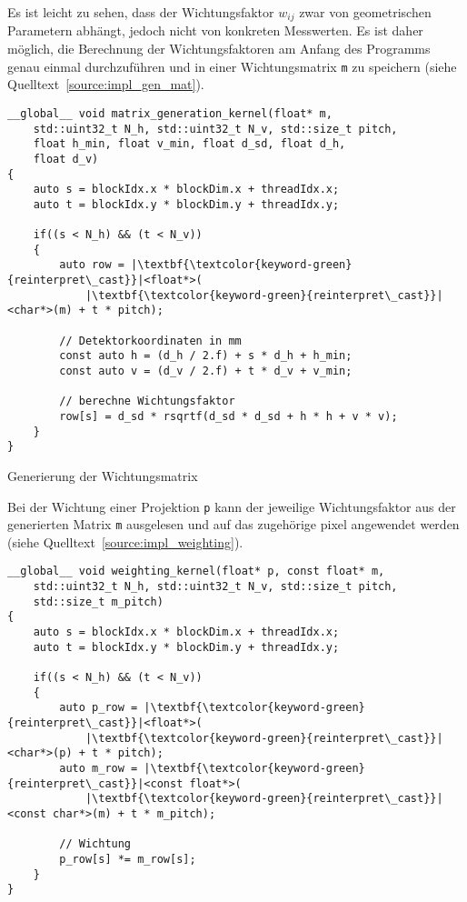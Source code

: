 Es ist leicht zu sehen, dass der Wichtungsfaktor $w_{ij}$ zwar von geometrischen Parametern abhängt, jedoch nicht von
konkreten Messwerten. Es ist daher möglich, die Berechnung der Wichtungsfaktoren am Anfang des Programms genau einmal
durchzuführen und in einer Wichtungsmatrix \texttt{m} zu speichern (siehe Quelltext~\ref{source:impl_gen_mat}).

\begin{listing}
\begin{verbatim}
__global__ void matrix_generation_kernel(float* m,
    std::uint32_t N_h, std::uint32_t N_v, std::size_t pitch,
    float h_min, float v_min, float d_sd, float d_h,
    float d_v)
{
    auto s = blockIdx.x * blockDim.x + threadIdx.x;
    auto t = blockIdx.y * blockDim.y + threadIdx.y;

    if((s < N_h) && (t < N_v))
    {
        auto row = |\textbf{\textcolor{keyword-green}{reinterpret\_cast}}|<float*>(
            |\textbf{\textcolor{keyword-green}{reinterpret\_cast}}|<char*>(m) + t * pitch);

        // Detektorkoordinaten in mm
        const auto h = (d_h / 2.f) + s * d_h + h_min;
        const auto v = (d_v / 2.f) + t * d_v + v_min;

        // berechne Wichtungsfaktor
        row[s] = d_sd * rsqrtf(d_sd * d_sd + h * h + v * v);
    }
}
\end{verbatim}
\caption{Generierung der Wichtungsmatrix}
\label{source:impl_gen_mat}
\end{listing}

Bei der Wichtung einer Projektion \texttt{p} kann der jeweilige Wichtungsfaktor aus der generierten Matrix \texttt{m}
ausgelesen und auf das zugehörige \gls{pixel} angewendet werden (siehe Quelltext~\ref{source:impl_weighting}). 

\begin{listing}
\begin{verbatim}
__global__ void weighting_kernel(float* p, const float* m,
    std::uint32_t N_h, std::uint32_t N_v, std::size_t pitch,
    std::size_t m_pitch)
{
    auto s = blockIdx.x * blockDim.x + threadIdx.x;
    auto t = blockIdx.y * blockDim.y + threadIdx.y;

    if((s < N_h) && (t < N_v))
    {
        auto p_row = |\textbf{\textcolor{keyword-green}{reinterpret\_cast}}|<float*>(
            |\textbf{\textcolor{keyword-green}{reinterpret\_cast}}|<char*>(p) + t * pitch);
        auto m_row = |\textbf{\textcolor{keyword-green}{reinterpret\_cast}}|<const float*>(
            |\textbf{\textcolor{keyword-green}{reinterpret\_cast}}|<const char*>(m) + t * m_pitch);

        // Wichtung
        p_row[s] *= m_row[s];
    }
}
\end{verbatim}
\label{source:impl_weighting}
\end{listing}

